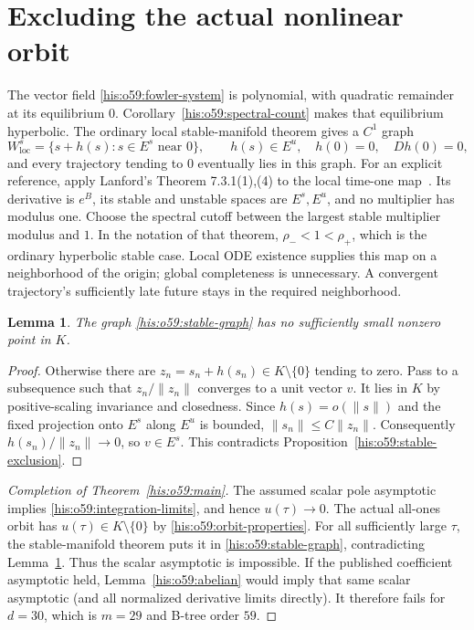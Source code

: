 \documentclass[11pt]{article}
\newtheorem{lemma}[theorem]{Lemma}
\theoremstyle{remark}\newtheorem{remark}[theorem]{Remark}
\newcommand{\norm}[1]{\lVert#1\rVert}
\numberwithin{equation}{section}
\begin{document}
\section{Excluding the actual nonlinear orbit}\label{his:o59:sec:orbit}
The vector field \eqref{his:o59:fowler-system} is polynomial, with quadratic
remainder at its equilibrium $0$. Corollary~\ref{his:o59:spectral-count}
makes that equilibrium hyperbolic. The ordinary local stable-manifold
theorem gives a $C^1$ graph
\begin{equation}\label{his:o59:stable-graph}
W^s_{\mathrm{loc}}=
\{s+h(s):s\in E^s\text{ near }0\},\qquad
h(s)\in E^u,\quad h(0)=0,\quad Dh(0)=0,
\end{equation}
and every trajectory tending to $0$ eventually lies in this graph.
For an explicit reference, apply Lanford's Theorem 7.3.1(1),(4)
to the local time-one map~\cite[printed p.~74, PDF p.~76]{lanford1997}.
Its derivative is $e^B$, its stable and unstable spaces are $E^s,E^u$,
and no multiplier has modulus one. Choose the spectral cutoff between
the largest stable multiplier modulus and $1$. In the notation of that
theorem, $\rho_-<1<\rho_+$, which is the ordinary hyperbolic stable
case. Local ODE existence supplies this map on a neighborhood of the
origin; global completeness is unnecessary. A convergent trajectory's
sufficiently late future stays in the required neighborhood.

\begin{lemma}\label{his:o59:tangent-cone}
The graph \eqref{his:o59:stable-graph} has no sufficiently small nonzero point
in $K$.
\end{lemma}
\begin{proof}
Otherwise there are $z_n=s_n+h(s_n)\in K\setminus\{0\}$ tending to
zero. Pass to a subsequence such that $z_n/\norm{z_n}$ converges to
a unit vector $v$. It lies in $K$ by positive-scaling invariance and
closedness. Since $h(s)=o(\norm{s})$ and the fixed projection onto
$E^s$ along $E^u$ is bounded, $\norm{s_n}\le C\norm{z_n}$.
Consequently $h(s_n)/\norm{z_n}\to0$, so $v\in E^s$.
This contradicts Proposition~\ref{his:o59:stable-exclusion}.
\end{proof}

\begin{proof}[Completion of Theorem~\ref{his:o59:main}]
The assumed scalar pole asymptotic implies \eqref{his:o59:integration-limits},
and hence $u(\tau)\to0$. The actual all-ones orbit has
$u(\tau)\in K\setminus\{0\}$ by \eqref{his:o59:orbit-properties}.
For all sufficiently large $\tau$, the stable-manifold theorem puts
it in \eqref{his:o59:stable-graph}, contradicting Lemma~\ref{his:o59:tangent-cone}.
Thus the scalar asymptotic is impossible. If the published coefficient
asymptotic held, Lemma~\ref{his:o59:abelian} would imply that same scalar
asymptotic (and all normalized derivative limits directly).
It therefore fails for $d=30$, which is $m=29$ and B-tree order $59$.
\end{proof}
\end{document}
